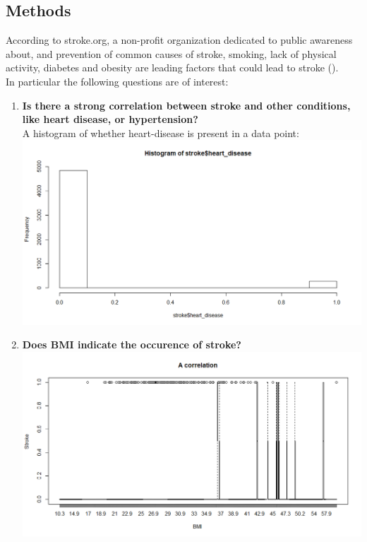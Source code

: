 \documentclass[boxes, qed]{homework}
\begin{document}
\subsection*{Methods}
According to stroke.org, a non-profit organization dedicated to public awareness about,
and prevention of common causes of stroke, smoking, lack of physical activity, diabetes and 
obesity are leading factors that could lead to stroke (\cite{strokeorg}).\\
In particular the following questions are of interest:
\begin{enumerate}
  \item \textbf{Is there a strong correlation between stroke and other conditions, 
  like heart disease, or hypertension?}\\
  A histogram of whether heart-disease is present in a data point:\\
  \includegraphics[scale=.5]{stroke-heart}

  \item \textbf{Does BMI indicate the occurence of stroke?}\\
  \includegraphics[scale=.5]{stroke-bmi}
\end{enumerate}

\pagebreak
\printbibliography
\end{document}
